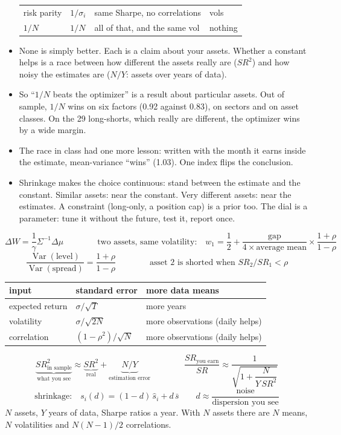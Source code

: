\documentclass[11pt]{article}
\newcounter{ex}[section]
\newcommand{\SR}{\mathit{SR}}
\begin{document}
\begin{itemize}
\begin{center}
{\begin{tabular}{@{}llll@{}}
risk parity & $1/\sigma_{i}$ & same Sharpe, no correlations & vols \\
$1/N$ & $1/N$ & all of that, and the same vol & nothing \\
\bottomrule
\end{tabular}}
\end{center}
\item None is simply better. Each is a claim about your assets. Whether a constant helps is a race between how
different the assets really are ($\SR^{2}$) and how noisy the estimates are ($N/Y$: assets over years of data).
\item So ``$1/N$ beats the optimizer'' is a result about particular assets. Out of sample, $1/N$ wins on six factors
(0.92 against 0.83), on sectors and on asset classes. On the 29 long-shorts, which really are different, the optimizer
wins by a wide margin.
\item The race in class had one more lesson: written with the month it earns inside the estimate, mean-variance
``wins'' (1.03). One index flips the conclusion.
\item Shrinkage makes the choice continuous: stand between the estimate and the constant. Similar assets: near the
constant. Very different assets: near the estimates. A constraint (long-only, a position cap) is a prior too. The dial
is a parameter: tune it without the future, test it, report once.
\end{itemize}

\begin{keybox}
\[ \Delta W = \frac{1}{\gamma}\Sigma^{-1}\Delta\mu \qquad\qquad
   \text{two assets, same volatility:}\quad w_{1} = \frac{1}{2} + \frac{\text{gap}}{4\times\text{average mean}}\times\frac{1+\rho}{1-\rho} \]
\[ \frac{\operatorname{Var}(\text{level})}{\operatorname{Var}(\text{spread})} = \frac{1+\rho}{1-\rho}
   \qquad\qquad \text{asset 2 is shorted when } \SR_{2}/\SR_{1} < \rho \]
\begin{center}
\begin{tabular}{lll}
\toprule
input & standard error & more data means \\
\midrule
expected return & $\sigma/\sqrt{T}$ & more years \\
volatility & $\sigma/\sqrt{2N}$ & more observations (daily helps) \\
correlation & $(1-\rho^{2})/\sqrt{N}$ & more observations (daily helps) \\
\bottomrule
\end{tabular}
\end{center}
\[ \underbrace{\SR^{2}_{\text{in sample}}}_{\text{what you see}} \approx \underbrace{\SR^{2}}_{\text{real}} +
   \underbrace{N/Y}_{\text{estimation error}}
   \qquad\qquad \frac{\SR_{\text{you earn}}}{\SR} \approx \frac{1}{\sqrt{1 + \dfrac{N}{Y\,\SR^{2}}}} \]
\[ \text{shrinkage:}\quad s_{i}(d) = (1-d)\,\hat s_{i} + d\,\bar s \qquad d \approx \frac{\text{noise}}{\text{dispersion you see}} \]
{\small $N$ assets, $Y$ years of data, Sharpe ratios a year. With $N$ assets there are $N$ means, $N$ volatilities and
$N(N-1)/2$ correlations.}
\end{keybox}
\end{document}
